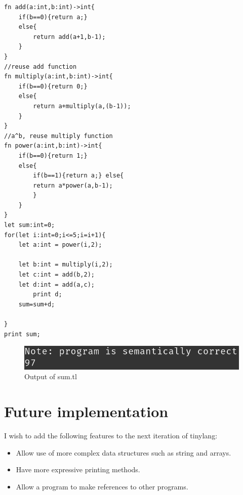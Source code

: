 \begin{itemize}
\begin{lstlisting}[basicstyle=\tiny,caption=sum.tl]
fn add(a:int,b:int)->int{
    if(b==0){return a;}
    else{
    	return add(a+1,b-1);
    }
}
//reuse add function
fn multiply(a:int,b:int)->int{
    if(b==0){return 0;}
    else{
    	return a+multiply(a,(b-1));
    }
}
//a^b, reuse multiply function
fn power(a:int,b:int)->int{
    if(b==0){return 1;}
    else{
    	if(b==1){return a;} else{
    	return a*power(a,b-1);
    	}
    }
}
let sum:int=0;
for(let i:int=0;i<=5;i=i+1){
	let a:int = power(i,2);
	
	let b:int = multiply(i,2);
	let c:int = add(b,2);
	let d:int = add(a,c);
		print d;
	sum=sum+d;

}
print sum;
\end{lstlisting}
\begin{figure}[H]
    \centering
    \includegraphics[scale=1.2]{Task345/images/sum.png}
    \caption{Output of sum.tl}
    \label{fig:output fibonacci}
\end{figure}
\end{itemize}
\section{Future implementation}
I wish to add the following features to the next iteration of tinylang:
\begin{itemize}
    \item Allow use of more complex data structures such as string and arrays.
    \item Have more expressive printing methods.
    \item Allow a program to make references to other programs.
\end{itemize}


